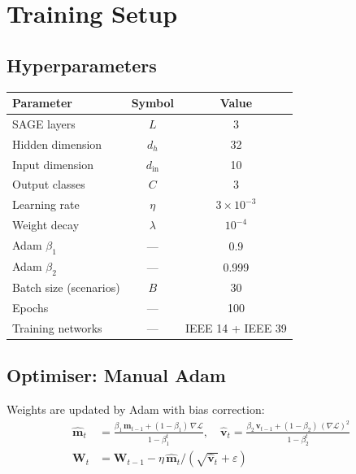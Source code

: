 \documentclass[11pt,a4paper]{article}
\begin{document}
\section{Training Setup}
\label{sec:training}

\subsection{Hyperparameters}

\begin{center}
\begin{tabular}{lcc}
\toprule
Parameter & Symbol & Value \\
\midrule
SAGE layers         & $L$       & 3 \\
Hidden dimension    & $d_h$     & 32 \\
Input dimension     & $d_\text{in}$ & 10 \\
Output classes      & $C$       & 3 \\
Learning rate       & $\eta$    & $3\times10^{-3}$ \\
Weight decay        & $\lambda$ & $10^{-4}$ \\
Adam $\beta_1$      & ---       & 0.9 \\
Adam $\beta_2$      & ---       & 0.999 \\
Batch size (scenarios) & $B$   & 30 \\
Epochs              & ---       & 100 \\
Training networks   & ---       & IEEE 14 + IEEE 39 \\
\bottomrule
\end{tabular}
\end{center}

\subsection{Optimiser: Manual Adam}

Weights are updated by Adam with bias correction:
\begin{align}
  \hat{\mathbf{m}}_t &= \frac{\beta_1\,\mathbf{m}_{t-1}
    + (1-\beta_1)\,\nabla\mathcal{L}}{1-\beta_1^t}, \quad
  \hat{\mathbf{v}}_t = \frac{\beta_2\,\mathbf{v}_{t-1}
    + (1-\beta_2)\,(\nabla\mathcal{L})^2}{1-\beta_2^t} \\
  \mathbf{W}_t &= \mathbf{W}_{t-1}
    - \eta\,\hat{\mathbf{m}}_t / (\sqrt{\hat{\mathbf{v}}_t}+\varepsilon)
\end{align}
\end{document}
